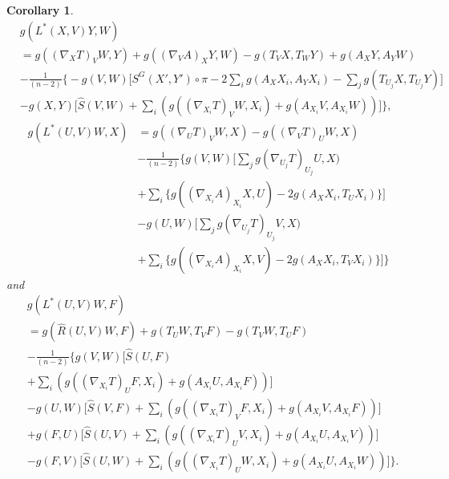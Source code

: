 \documentclass{birkjour}
\newtheorem{corollary}[theorem]{Corollary}
\theoremstyle{definition}
\theoremstyle{remark}
\numberwithin{equation}{section}
\begin{document}
\begin{corollary}
	\begin{align*}
		&g(L^* (X,V)Y ,W)\\
		&= g((\nabla_X T)_V W, Y) + g((\nabla_V A)_X Y,W)- g(T_V X, T_W Y) + g(A_X Y, A_Y W)\\
		&-\frac{1}{(n-2)} \bigg\{ - g(V,W) \Big[ S^G (X', Y') \circ \pi
		- 2 \sum_{i} g(A_X X_i, A_Y X_i) -\sum_{j} g(T_{U_j}X, T_{U_j}Y) \Big]\\
		& - g(X,Y) \Big[\hat{S} (V,W) + \sum_{i}\left(g((\nabla_{X_i}T)_V W,X_i)
		+ g(A_{X_i} V, A_{X_i}W)  \right) \Big] \bigg\},
	\end{align*}
	\begin{align*}
		g(L^* (U,V)W ,X)&= g((\nabla_U T)_V W, X) - g((\nabla_V T)_U W, X)\\
		&- \frac{1}{(n-2)} \bigg\{g(V,W) \Big[\sum_{j} g(\nabla_{U_j}T)_{U_j}U,X)  \\
		&+ \sum_{i} \{g((\nabla_{X_i}A)_{X_i} X,U)-2g(A_X {X_i}, T_U X_i)\}\Big] \\
		&- g(U,W)  \Big[\sum_{j} g(\nabla_{U_j}T)_{U_j}V,X)  \\
		&+ \sum_{i} \{g((\nabla_{X_i}A)_{X_i} X,V)-2g(A_X {X_i}, T_V X_i)\}\Big] \bigg\}
	\end{align*}
	and
	\begin{align*}
		&g(L^* (U,V)W ,F)\\
		&= g(\hat{R} (U,V)W, F) + g(T_U W, T_V F) - g(T_V W, T_U F ) \\
		&- \frac{1}{(n-2)} \bigg\{g(V,W) \Big[\hat{S}(U,F) \\
		&+ \sum_{i}\left(g((\nabla_{X_i}T)_U F, X_i)+g(A_{X_i}U,A_{X_i}F)\right)\Big]\\
		&-g(U,W) \Big[\hat{S}(V,F)
		+ \sum_{i}\left(g((\nabla_{X_i}T)_V F, X_i)+ g(A_{X_i} V, A_{X_i}F)\right)\Big] \\
		&+g(F,U) \Big[ \hat{S}(U,V)
		+ \sum_{i}\left(g((\nabla_{X_i}T)_U V, {X_i})+ g(A_{X_i}U, A_{X_i}V)\right)  \Big] \\
		&-g(F,V) \Big[ \hat{S}(U,W)
		+ \sum_{i}\left( g((\nabla_{X_i}T)_U W, X_i)+ g(A_{X_i}U, A_{X_i}W) \right) \Big] \bigg\}.
	\end{align*}
\end{corollary}
\end{document}
